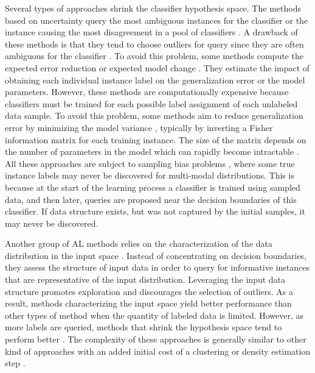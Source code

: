 \documentclass{article}
\begin{document}
Several types of approaches shrink the classifier hypothesis space. The methods based on uncertainty query the most ambiguous instances for the classifier \cite{Tong2001,Lewis1994} or the instance causing the most disagreement in a pool of classifiers \cite{Seung1992,Melville2004}. A drawback of these methods is that they tend to choose outliers for query since they are often ambiguous for the classifier \cite{Tang2002,Zhu2008}. To avoid this problem, some methods compute the expected error reduction \cite{Roy2001,Guo2007} or expected model change \cite{Settles2008}. They estimate the impact of obtaining each individual instance label on the generalization error or the model parameters. However, these methods are computationally expensive because classifiers must be trained for each possible label assignment of each unlabeled data sample. To avoid this problem, some methods aim to reduce generalization error by minimizing the model variance \cite{Hoi2006text,Cohn1994ALstat}, typically by inverting a Fisher information matrix for each training instance. The size of the matrix depends on the number of parameters in the model which can rapidly become intractable \cite{Settles2009survey}. All these approaches are subject to sampling bias problems \cite{Dasgupta2011twofaces}, where some true instance labels may never be discovered for multi-modal distributions. This is because at the start of the learning process a classifier is trained using sampled data, and then later, queries are proposed near the decision boundaries of this classifier. If data structure exists, but was not captured by the initial samples, it may never be discovered.

Another group of AL methods relies on the characterization of the data distribution in the input space \cite{Settles2008ID,Fujii1998,Nguyen2004}. Instead of concentrating on decision boundaries, they assess the structure of input data in order to query for informative instances that are representative of the input distribution. Leveraging the input data structure promotes exploration and discourages the selection of outliers. As a result, methods characterizing the input space yield better performance than other types of method when the quantity of labeled data is limited. However, as more labels are queried, methods that shrink the hypothesis space tend to perform better \cite{Wang2015QDR}. The complexity of these approaches is generally similar to other kind of approaches with an added initial cost of a clustering or density estimation step \cite{Settles2008ID}. 
\end{document}
